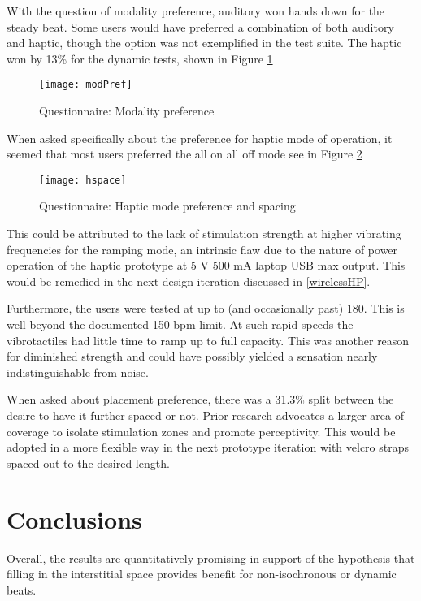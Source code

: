 With the question of modality preference, auditory won hands down for the steady beat. Some users would have preferred a combination of both auditory and haptic, though the option was not exemplified in the test suite. The haptic won by 13\% for the dynamic tests, shown in Figure \ref{fig:modPref}
\begin{figure}[H]
    \centering
    \texttt{[image: modPref]}
    \caption{Questionnaire: Modality preference}
    \label{fig:modPref}
\end{figure}

When asked specifically about the preference for haptic mode of operation, it seemed that most users preferred the all on all off mode see in Figure \ref{fig:hspace}
\begin{figure}[H]
    \centering
    \texttt{[image: hspace]}
    \caption{Questionnaire: Haptic mode preference and spacing}
    \label{fig:hspace}
\end{figure}

This could be attributed to the lack of stimulation strength at higher vibrating frequencies for the ramping mode, an intrinsic flaw due to the nature of power operation of the haptic prototype at 5 V 500 mA laptop USB max output. This would be remedied in the next design iteration discussed in \ref{wirelessHP}. 

Furthermore, the users were tested at up to (and occasionally past) 180. This is well beyond the documented 150 bpm limit. At such rapid speeds the vibrotactiles had little time to ramp up to full capacity. This was another reason for diminished strength and could have possibly yielded a sensation nearly indistinguishable from noise.

When asked about placement preference, there was a 31.3\% split between the desire to have it further spaced or not. Prior research advocates a larger area of coverage to isolate stimulation zones and promote perceptivity. This would be adopted in a more flexible way in the next prototype iteration with velcro straps spaced out to the desired length.

\section{Conclusions}
Overall, the results are quantitatively promising in support of the hypothesis that filling in the interstitial space provides benefit for non-isochronous or dynamic beats.